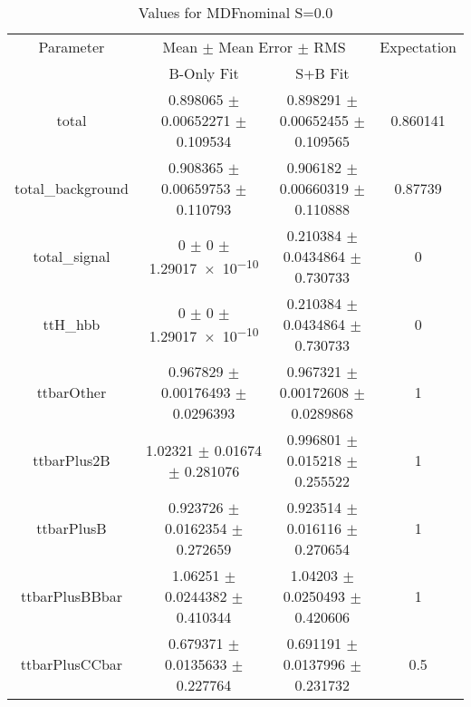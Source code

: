 \begin{table}
\centering
\caption{Values for MDFnominal S=0.0}
\begin{tabular}{cccc}
\toprule
Parameter & \multicolumn{2}{c}{Mean $\pm$ Mean Error $\pm$ RMS} & Expectation\\
 & B-Only Fit & S+B Fit & \\
\midrule
total & \num{0.898065} $\pm$ \num{0.00652271} $\pm$ \num{0.109534} & \num{0.898291} $\pm$ \num{0.00652455} $\pm$ \num{0.109565} & \num{0.860141}\\
total\_background & \num{0.908365} $\pm$ \num{0.00659753} $\pm$ \num{0.110793} & \num{0.906182} $\pm$ \num{0.00660319} $\pm$ \num{0.110888} & \num{0.87739}\\
total\_signal & \num{0} $\pm$ \num{0} $\pm$ \num{1.29017e-10} & \num{0.210384} $\pm$ \num{0.0434864} $\pm$ \num{0.730733} & \num{0}\\
ttH\_hbb & \num{0} $\pm$ \num{0} $\pm$ \num{1.29017e-10} & \num{0.210384} $\pm$ \num{0.0434864} $\pm$ \num{0.730733} & \num{0}\\
ttbarOther & \num{0.967829} $\pm$ \num{0.00176493} $\pm$ \num{0.0296393} & \num{0.967321} $\pm$ \num{0.00172608} $\pm$ \num{0.0289868} & \num{1}\\
ttbarPlus2B & \num{1.02321} $\pm$ \num{0.01674} $\pm$ \num{0.281076} & \num{0.996801} $\pm$ \num{0.015218} $\pm$ \num{0.255522} & \num{1}\\
ttbarPlusB & \num{0.923726} $\pm$ \num{0.0162354} $\pm$ \num{0.272659} & \num{0.923514} $\pm$ \num{0.016116} $\pm$ \num{0.270654} & \num{1}\\
ttbarPlusBBbar & \num{1.06251} $\pm$ \num{0.0244382} $\pm$ \num{0.410344} & \num{1.04203} $\pm$ \num{0.0250493} $\pm$ \num{0.420606} & \num{1}\\
ttbarPlusCCbar & \num{0.679371} $\pm$ \num{0.0135633} $\pm$ \num{0.227764} & \num{0.691191} $\pm$ \num{0.0137996} $\pm$ \num{0.231732} & \num{0.5}\\
\bottomrule
\end{tabular}
\end{table}
